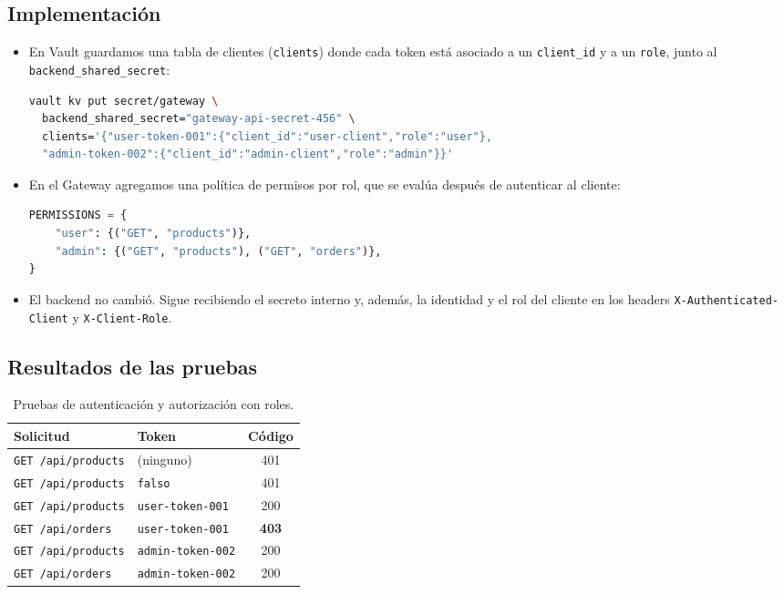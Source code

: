 \documentclass[11pt,a4paper]{article}
\begin{document}
\subsection{Implementación}

\begin{itemize}
  \item En Vault guardamos una tabla de clientes (\texttt{clients}) donde cada token está asociado a un \texttt{client\_id} y a un \texttt{role}, junto al \texttt{backend\_shared\_secret}:

\begin{lstlisting}[language=bash]
vault kv put secret/gateway \
  backend_shared_secret="gateway-api-secret-456" \
  clients='{"user-token-001":{"client_id":"user-client","role":"user"},
  "admin-token-002":{"client_id":"admin-client","role":"admin"}}'
\end{lstlisting}

  \item En el Gateway agregamos una política de permisos por rol, que se evalúa después de autenticar al cliente:

\begin{lstlisting}[language=python]
PERMISSIONS = {
    "user": {("GET", "products")},
    "admin": {("GET", "products"), ("GET", "orders")},
}
\end{lstlisting}

  \item El backend no cambió. Sigue recibiendo el secreto interno y, además, la identidad y el rol del cliente en los headers \texttt{X-Authenticated-Client} y \texttt{X-Client-Role}.
\end{itemize}

\subsection{Resultados de las pruebas}

\begin{table}[h]
\centering
\begin{tabular}{@{}llc@{}}
\toprule
\textbf{Solicitud} & \textbf{Token} & \textbf{Código} \\
\midrule
\texttt{GET /api/products} & (ninguno) & 401 \\
\texttt{GET /api/products} & \texttt{falso} & 401 \\
\texttt{GET /api/products} & \texttt{user-token-001} & 200 \\
\texttt{GET /api/orders} & \texttt{user-token-001} & \textbf{403} \\
\texttt{GET /api/products} & \texttt{admin-token-002} & 200 \\
\texttt{GET /api/orders} & \texttt{admin-token-002} & 200 \\
\bottomrule
\end{tabular}
\caption{Pruebas de autenticación y autorización con roles.}
\end{table}
\end{document}
